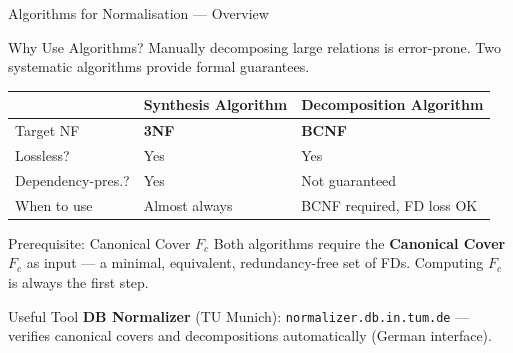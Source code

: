 \begin{frame}{Algorithms for Normalisation --- Overview}
  \begin{block}{Why Use Algorithms?}
    Manually decomposing large relations is error-prone.  Two systematic
    algorithms provide formal guarantees.
  \end{block}

  \begin{center}
    \small
    \begin{tabular}{lll}
      \toprule
      & \textbf{Synthesis Algorithm} & \textbf{Decomposition Algorithm} \\
      \midrule
      Target NF         & \textbf{3NF}      & \textbf{BCNF} \\
      Lossless?         & Yes               & Yes \\
      Dependency-pres.? & Yes               & Not guaranteed \\
      When to use       & Almost always     & BCNF required, FD loss OK \\
      \bottomrule
    \end{tabular}
  \end{center}

  \vspace{0.6em}
  \begin{block}{Prerequisite: Canonical Cover $F_c$}
    Both algorithms require the \textbf{Canonical Cover} $F_c$ as input --- a
    minimal, equivalent, redundancy-free set of FDs.
    Computing $F_c$ is always the first step.
  \end{block}

  \begin{block}{Useful Tool}
    \textbf{DB Normalizer} (TU Munich):
    \texttt{normalizer.db.in.tum.de} --- verifies canonical covers and
    decompositions automatically (German interface).
  \end{block}
\end{frame}

